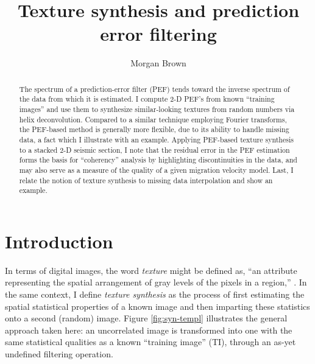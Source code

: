 
\title{ Texture synthesis and prediction error filtering}
\author{Morgan Brown}

\maketitle

\begin{abstract}
	The spectrum of a prediction-error filter (PEF) tends toward the inverse spectrum of the
	data from which it is estimated.  
	I compute 2-D PEF's from known ``training images'' and use them to synthesize 
	similar-looking textures from random numbers via helix deconvolution.  
	Compared to a similar technique employing Fourier transforms, the PEF-based method is 
	generally more flexible, due to its ability to handle missing data, a fact which I
	illustrate with an example. 
	Applying PEF-based texture synthesis to a stacked 2-D seismic section, 
	I note that the residual error in the PEF estimation forms the basis for ``coherency''
	analysis by highlighting discontinuities in the data, and may also serve as a measure 
	of the quality of a given migration velocity model. 
	Last, I relate the notion of texture synthesis to missing data interpolation and show
	an example.
\end{abstract} 

\section{Introduction}

	In terms of digital images, the word {\em texture} might be defined as,
	``an attribute representing the spatial arrangement of gray levels of the 
	pixels in a region,'' {\small \cite[]{IEEE}}.  In the same context, I define
	{\em texture synthesis} as the process of first estimating the spatial 
	statistical properties of a known image and then imparting these statistics 
	onto a second (random) image.  Figure \ref{fig:syn-templ} illustrates the
	general approach taken here: an uncorrelated image is transformed into
	one with the same statistical qualities as a known ``training image''
	(TI), through an as-yet undefined filtering operation.  



